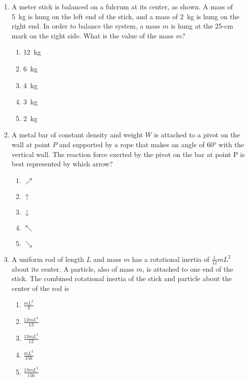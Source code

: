 \documentclass{../../../oss-apphys}
\begin{document}
\begin{multicols}{2}
\begin{enumerate}[leftmargin=18pt]
  \item A meter stick is balanced on a fulcrum at its center, as shown. A mass
    of \SI{5}{\kilo\gram} is hung on the left end of the stick, and a mass of
    \SI{2}{\kilo\gram} is hung on the right end. In order to balance the
    system, a mass $m$ is hung at the 25-cm mark on the right
    side. What is the value of the mass $m$?
    \begin{center}
    \end{center}
    \begin{enumerate}[nosep,leftmargin=18pt,label=(\Alph*)]
    \item\SI{12}{\kilo\gram}
    \item\SI{6 }{\kilo\gram}
    \item\SI{4 }{\kilo\gram}
    \item\SI{3 }{\kilo\gram}
    \item\SI{2 }{\kilo\gram}
    \end{enumerate}


  \item A metal bar of constant density and weight $W$ is attached to a pivot on
    the wall at point $P$ and supported by a rope that makes an angle of
    \ang{60} with the vertical wall. The reaction force exerted by the pivot on
    the bar at point P is best represented by which arrow?
    \begin{center}
    \end{center}
    \begin{enumerate}[nosep,leftmargin=18pt,label=(\Alph*)]
    \item\vspace{-.15in} $\nearrow$
    \item $\uparrow$
    \item $\downarrow$
    \item $\nwarrow$
    \item $\searrow$
    \end{enumerate}
    \columnbreak
    
  \item A uniform rod of length $L$ and mass $m$ has a rotational inertia of
    $\displaystyle \frac1{12}mL^2$ about its center. A particle, also of mass
    $m$, is attached to one end of the stick. The combined rotational inertia of
    the stick and particle about the center of the rod is
    \begin{center}
    \end{center}
    \begin{enumerate}[nosep,leftmargin=18pt,label=(\Alph*)]
    \item$\displaystyle\frac{mL^2}{3}$
    \item$\displaystyle\frac{12mL^2}{13}$
    \item$\displaystyle\frac{13mL^2}{12}$
    \item$\displaystyle\frac{mL^2}{156}$
    \item$\displaystyle\frac{13mL^2}{156}$
    \end{enumerate}


\end{enumerate}
\end{multicols}
\end{document}

